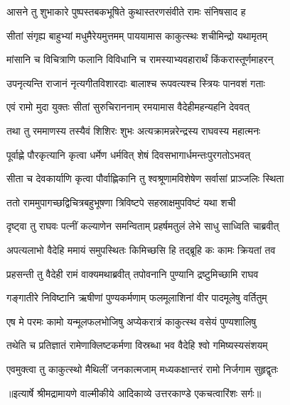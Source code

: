 \twolineshloka
{आसने तु शुभाकारे पुष्पस्तबकभूषिते}
{कुथास्तरणसंवीते रामः संनिषसाद ह} %

\twolineshloka
{सीतां संगृह्य बाहुभ्यां मधुमैरेयमुत्तमम्}
{पाययामास काकुत्स्थः शचीमिन्द्रो यथामृतम्} %

\twolineshloka
{मांसानि च विचित्राणि फलानि विविधानि च}
{रामस्याभ्यवहारार्थं किंकरास्तूर्णमाहरन्} %

\twolineshloka
{उपनृत्यन्ति राजानं नृत्यगीतविशारदाः}
{बालाश्च रूपवत्यश्च स्त्रियः पानवशं गताः} %

\twolineshloka
{एवं रामो मुदा युक्तः सीतां सुरुचिराननाम्}
{रमयामास वैदेहीमहन्यहनि देववत्} %

\twolineshloka
{तथा तु रममाणस्य तस्यैवं शिशिरः शुभः}
{अत्यक्रामन्नरेन्द्रस्य राघवस्य महात्मनः} %

\twolineshloka
{पूर्वाह्णे पौरकृत्यानि कृत्वा धर्मेण धर्मवित्}
{शेषं दिवसभागार्धमन्तःपुरगतोऽभवत्} %

\twolineshloka
{सीता च देवकार्याणि कृत्वा पौर्वाह्णिकानि तु}
{श्वश्रूणामविशेषेण सर्वासां प्राञ्जलिः स्थिता} %

\twolineshloka
{ततो राममुपागच्छद्विचित्रबहुभूषणा}
{त्रिविष्टपे सहस्राक्षमुपविष्टं यथा शची} %

\twolineshloka
{दृष्ट्वा तु राघवः पत्नीं कल्याणेन समन्विताम्}
{प्रहर्षमतुलं लेभे साधु साध्विति चाब्रवीत्} %

\twolineshloka
{अपत्यलाभो वैदेहि ममायं समुपस्थितः}
{किमिच्छसि हि तद्ब्रूहि कः कामः क्रियतां तव} %

\twolineshloka
{प्रहसन्ती तु वैदेही रामं वाक्यमथाब्रवीत्}
{तपोवनानि पुण्यानि द्रष्टुमिच्छामि राघव} %

\twolineshloka
{गङ्गातीरे निविष्टानि ऋषीणां पुण्यकर्मणाम्}
{फलमूलाशिनां वीर पादमूलेषु वर्तितुम्} %

\twolineshloka
{एष मे परमः कामो यन्मूलफलभोजिषु}
{अप्येकरात्रं काकुत्स्थ वसेयं पुण्यशालिषु} %

\twolineshloka
{तथेति च प्रतिज्ञातं रामेणाक्लिष्टकर्मणा}
{विस्रब्धा भव वैदेहि श्वो गमिष्यस्यसंशयम्} %

\twolineshloka
{एवमुक्त्वा तु काकुत्स्थो मैथिलीं जनकात्मजाम्}
{मध्यकक्षान्तरं रामो निर्जगाम सुहृद्वृतः} %


{॥इत्यार्षे श्रीमद्रामायणे वाल्मीकीये आदिकाव्ये उत्तरकाण्डे एकचत्वारिंशः सर्गः॥}


